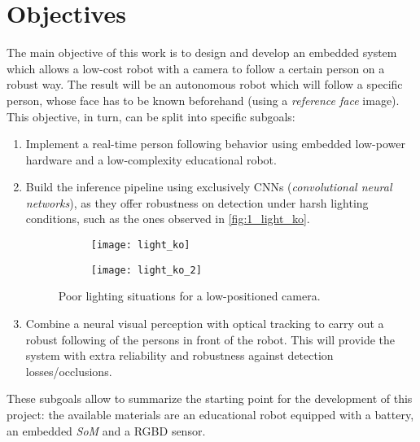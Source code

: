 	

\newpage
\section{Objectives}
\label{sec:1_objectives}

	The main objective of this work is to design and develop an embedded system which allows a low-cost robot with a camera to follow a certain person on a robust way. The result will be an autonomous robot which will follow a specific person, whose face has to be known beforehand (using a \textit{reference face} image). This objective, in turn, can be split into specific subgoals:
	
	\begin{enumerate}
		\item Implement a real-time person following behavior using embedded low-power hardware and a low-complexity educational robot.
		
		\item Build the inference pipeline using exclusively CNNs (\textit{convolutional neural networks}), as they offer robustness on detection under harsh lighting conditions, such as the ones observed in \autoref{fig:1_light_ko}.
		
		\begin{figure}[h]
			\centering
			\begin{subfigure}[b]{0.3\linewidth}
				\centering
				\texttt{[image: light\_ko]}
			\end{subfigure}
			\begin{subfigure}[b]{0.5\linewidth}
				\centering
				\texttt{[image: light\_ko\_2]}
			\end{subfigure}		
			
			\caption{Poor lighting situations for a low-positioned camera.}
			\label{fig:1_light_ko}
		\end{figure}
		
		
		\item Combine a neural visual perception with optical tracking to carry out a robust following of the persons in front of the robot. This will provide the system with extra reliability and robustness against detection losses/occlusions.
	\end{enumerate}
	
These subgoals allow to summarize the starting point for the development of this project: the available materials are an educational robot equipped with a battery, an embedded \textit{SoM} and a RGBD sensor.\\
\newpage
